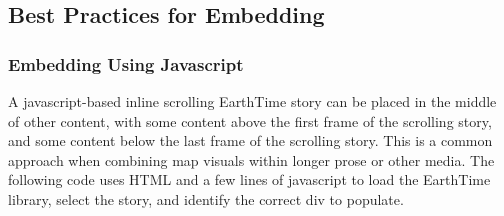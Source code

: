 \documentclass[
  12pt,
]{krantz}
\begin{document}
\hypertarget{best-practices-for-embedding}{%
\subsection{Best Practices for Embedding}\label{best-practices-for-embedding}}

\hypertarget{embedding-using-javascript}{%
\subsubsection*{Embedding Using Javascript}\label{embedding-using-javascript}}


A javascript-based inline scrolling EarthTime story can be placed in the middle of other content, with some content above the first frame of the scrolling story, and some content below the last frame of the scrolling story. This is a common approach when combining map visuals within longer prose or other media. The following code uses HTML and a few lines of javascript to load the EarthTime library, select the story, and identify the correct div to populate.
\end{document}
